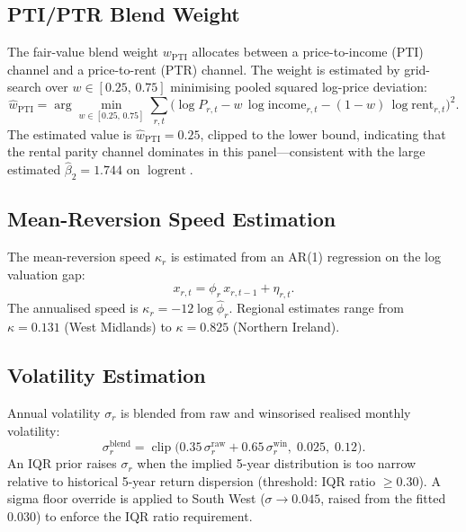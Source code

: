 \documentclass[11pt,a4paper]{article}
\theoremstyle{plain}
\theoremstyle{definition}
\newcommand{\kap}{\kappa}
\newcommand{\sig}{\sigma}
\newcommand{\clip}{\operatorname{clip}}
\begin{document}
\subsection{PTI/PTR Blend Weight}

The fair-value blend weight $w_{\mathrm{PTI}}$ allocates between a
price-to-income (PTI) channel and a price-to-rent (PTR) channel.
The weight is estimated by grid-search over
$w \in [0.25,\,0.75]$ minimising pooled squared log-price deviation:
\begin{equation}
  \hat{w}_{\mathrm{PTI}}
  = \arg\min_{w\in[0.25,\,0.75]}
    \sum_{r,t}
    \bigl(\log P_{r,t}
          - w\,\log\text{income}_{r,t}
          - (1-w)\,\log\text{rent}_{r,t}\bigr)^2.
\end{equation}
The estimated value is $\hat{w}_{\mathrm{PTI}} = 0.25$, clipped to the
lower bound, indicating that the rental parity channel dominates in this
panel---consistent with the large estimated $\hat\beta_2 = 1.744$
on $\log\text{rent}$.

\subsection{Mean-Reversion Speed Estimation}

The mean-reversion speed $\kap_r$ is estimated from an AR(1) regression
on the log valuation gap:
\begin{equation}
  x_{r,t} = \phi_r\,x_{r,t-1} + \eta_{r,t}.
\end{equation}
The annualised speed is $\kap_r = -12\log\hat\phi_r$.  Regional
estimates range from $\kap = 0.131$ (West Midlands) to
$\kap = 0.825$ (Northern Ireland).

\subsection{Volatility Estimation}

Annual volatility $\sig_r$ is blended from raw and winsorised
realised monthly volatility:
\begin{equation}
  \sig^{\mathrm{blend}}_r
  = \clip\!\bigl(
      0.35\,\sig^{\mathrm{raw}}_r
    + 0.65\,\sig^{\mathrm{win}}_r,\;
      0.025,\; 0.12
    \bigr).
\end{equation}
An IQR prior raises $\sig_r$ when the implied 5-year distribution
is too narrow relative to historical 5-year return dispersion
(threshold: IQR ratio $\geq 0.30$).
A sigma floor override is applied to South West ($\sig \to 0.045$,
raised from the fitted 0.030) to enforce the IQR ratio requirement.
\end{document}
